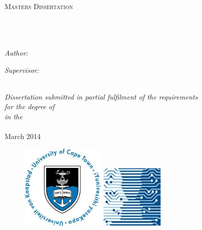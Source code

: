 \documentclass[11pt, a4paper,oneside]{Thesis} %
\begin{document}
\begin{titlepage}

\begin{center}

\textsc{\LARGE \univname}\\[1.5cm] %
\textsc{\Large Masters Dissertation}\\[0.5cm] %

\HRule \\[0.4cm] %
{\huge \bfseries \ttitle}\\[0.4cm] %
\HRule \\[1.5cm] %
 
\begin{minipage}{0.4\textwidth}
\begin{flushleft} \large
\emph{Author:}\\
\authornames %
\end{flushleft}
\end{minipage}
\begin{minipage}{0.4\textwidth}
\begin{flushright} \large
\emph{Supervisor:} \\
\supname %
\end{flushright}
\end{minipage}\\[2cm]

\large \textit{Dissertation submitted in partial fulfilment of the requirements\\ for the degree of \degreename}\\[0.3cm] %
\textit{in the}\\[0.4cm]
\deptname\\[1.5cm] %
{\large March 2014}\\[0.5cm] %
 \begin{figure}[h!]
 \centering
 \includegraphics[width=4cm]{Figures/uctlogo.jpg} 
 \hspace{2cm} 
 \includegraphics[width=3cm]{Figures/compsci.jpg}  
 \end{figure} 

\end{center}

\end{titlepage}
\end{document}
